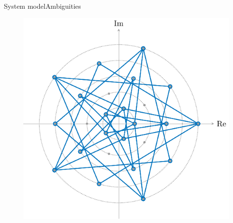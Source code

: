\documentclass[en]{sdqbeamer}
\begin{document}
\begin{frame}{System model}{Ambiguities}
\begin{figure}[htb]
     \centering
         \includegraphics[height=0.7\textheight]{Eq_class_construction_16.pdf}
\end{figure}

\end{frame}
\end{document}
